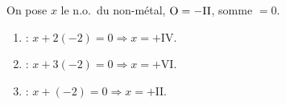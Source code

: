 \documentclass[11pt,a4paper]{article}
\begin{document}
\begin{corrige}
On pose $x$ le n.o.\ du non-métal, $\ce{O}=-\mathrm{II}$, somme $=0$.
\begin{enumerate}[label=\alph*)]
  \item {} : $x+2(-2)=0 \Rightarrow x=+\mathrm{IV}$.
  \item {} : $x+3(-2)=0 \Rightarrow x=+\mathrm{VI}$.
  \item {} : $x+(-2)=0 \Rightarrow x=+\mathrm{II}$.
\end{enumerate}
\end{corrige}
\end{document}
